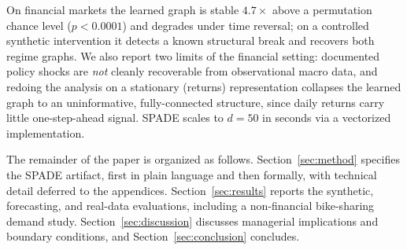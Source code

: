 \begin{enumerate}
    On financial markets the learned graph is stable $4.7\times$ above a
    permutation chance level ($p<0.0001$) and degrades under time reversal; on a
    controlled synthetic intervention it detects a known structural break and
    recovers both regime graphs. We also report two limits of the financial
    setting: documented policy shocks are \emph{not} cleanly recoverable from
    observational macro data, and redoing the analysis on a stationary (returns)
    representation collapses the learned graph to an uninformative,
    fully-connected structure, since daily returns carry little one-step-ahead
    signal. SPADE scales to $d{=}50$ in seconds via a vectorized implementation.
\end{enumerate}

The remainder of the paper is organized as follows.
Section~\ref{sec:method} specifies the SPADE artifact, first in plain language
and then formally, with technical detail deferred to the appendices.
Section~\ref{sec:results} reports the synthetic, forecasting, and real-data
evaluations, including a non-financial bike-sharing demand study.
Section~\ref{sec:discussion} discusses managerial implications and boundary
conditions, and Section~\ref{sec:conclusion} concludes.


